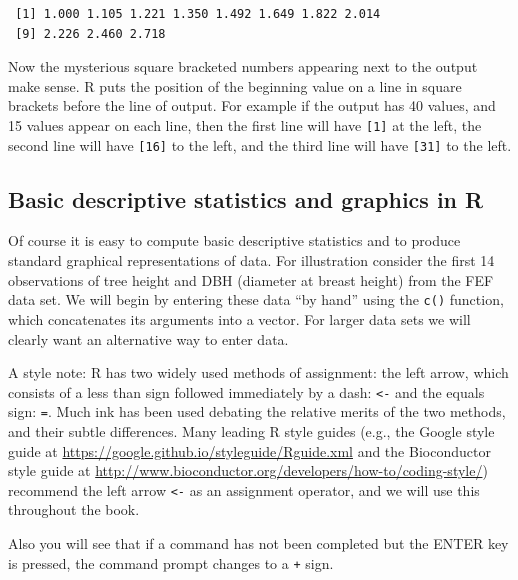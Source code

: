 \documentclass[]{krantz}
\theoremstyle{definition}
\theoremstyle{definition}
\theoremstyle{definition}
\theoremstyle{remark}
\begin{document}
\begin{verbatim}
 [1] 1.000 1.105 1.221 1.350 1.492 1.649 1.822 2.014
 [9] 2.226 2.460 2.718
\end{verbatim}

Now the mysterious square bracketed numbers appearing next to the output
make sense. R puts the position of the beginning value on a line in
square brackets before the line of output. For example if the output has
40 values, and 15 values appear on each line, then the first line will
have \texttt{{[}1{]}} at the left, the second line will have
\texttt{{[}16{]}} to the left, and the third line will have
\texttt{{[}31{]}} to the left.

\subsection{Basic descriptive statistics and graphics in
R}\label{sec:dec}

Of course it is easy to compute basic descriptive statistics and to
produce standard graphical representations of data. For illustration
consider the first 14 observations of tree height and DBH (diameter at
breast height) from the FEF data set. We will begin by entering these
data ``by hand'' using the \texttt{c()} function, which concatenates its
arguments into a vector. For larger data sets we will clearly want an
alternative way to enter data.

A style note: R has two widely used methods of assignment: the left
arrow, which consists of a less than sign followed immediately by a
dash: \texttt{\textless{}-} and the equals sign: \texttt{=}. Much ink
has been used debating the relative merits of the two methods, and their
subtle differences. Many leading R style guides (e.g., the Google style
guide at \url{https://google.github.io/styleguide/Rguide.xml} and the
Bioconductor style guide at
\url{http://www.bioconductor.org/developers/how-to/coding-style/})
recommend the left arrow \texttt{\textless{}-} as an assignment
operator, and we will use this throughout the book.

Also you will see that if a command has not been completed but the ENTER
key is pressed, the command prompt changes to a \texttt{+} sign.
\end{document}
